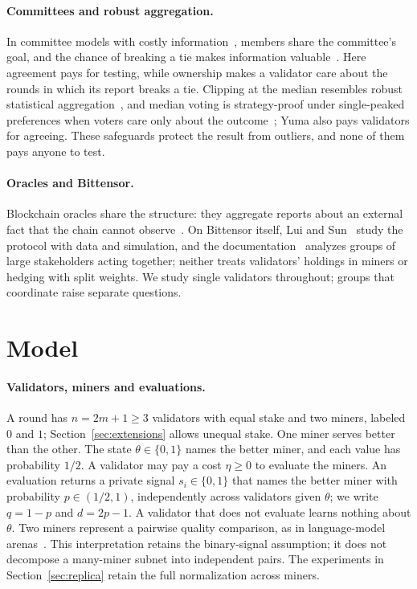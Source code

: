 \documentclass[sigconf,anonymous,review]{acmart}
\numberwithin{equation}{section}
\begin{document}
\paragraph{Committees and robust aggregation.} In committee models with
costly information~\cite{persico2004committee,gerardi2008information,
gershkov2009optimal}, members share the committee's goal, and the chance of
breaking a tie makes information valuable~\cite{austensmith1996information}.
Here agreement pays for testing, while ownership makes a validator care about
the rounds in which its report breaks a tie. Clipping at the median resembles
robust statistical aggregation~\cite{huber1964robust,yin2018byzantine}, and
median voting is strategy-proof under single-peaked preferences when voters
care only about the outcome~\cite{moulin1980strategy}; Yuma also pays
validators for agreeing. These safeguards protect the result from outliers,
and none of them pays anyone to test.

\paragraph{Oracles and Bittensor.} Blockchain oracles share the structure: they
aggregate reports about an external fact that the chain cannot
observe~\cite{eskandari2021sok}. On Bittensor itself, Lui and
Sun~\cite{lui2026bittensor} study the protocol with data and simulation, and the
documentation~\cite{bittensor2026yuma} analyzes groups of large stakeholders
acting together; neither treats validators' holdings in miners or hedging with
split weights. We
study single validators throughout; groups that coordinate raise separate
questions.

\section{Model}
\label{sec:model}

\paragraph{Validators, miners and evaluations.} A round has $n=2m+1\ge3$
validators with equal stake and two miners, labeled $0$ and $1$;
Section~\ref{sec:extensions} allows unequal stake. One miner serves better than
the other. The state $\theta\in\{0,1\}$ names the better miner, and each value
has probability $1/2$. A validator may pay a cost $\eta\ge0$ to evaluate the
miners. An evaluation returns a private signal $s_i\in\{0,1\}$ that names the
better miner with probability $p\in(1/2,1)$, independently across validators
given $\theta$; we write $q=1-p$ and $d=2p-1$. A validator that does not
evaluate learns nothing about $\theta$. Two miners represent a pairwise
quality comparison, as in language-model arenas~\cite{chiang2024chatbot}.
This interpretation retains the binary-signal assumption; it does not
decompose a many-miner subnet into independent pairs. The experiments in
Section~\ref{sec:replica} retain the full normalization across miners.
\end{document}
